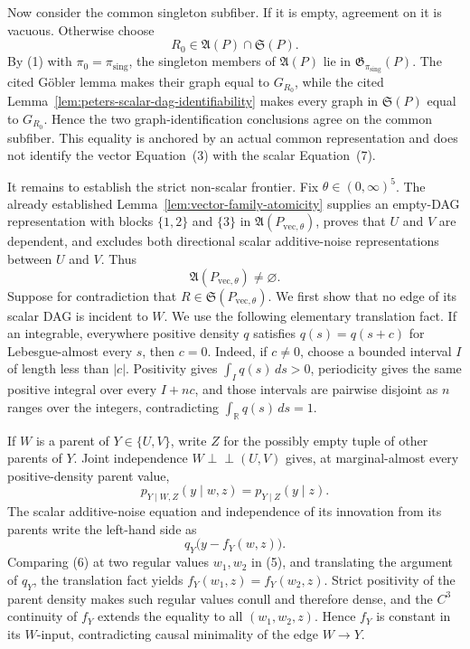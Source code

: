 Now consider the common singleton subfiber. If it is empty, agreement on it is vacuous. Otherwise choose
\[
R_0\in\mathfrak A(P)\cap\mathfrak S(P).
\]
By (1) with \(\pi_0=\pi_{\mathrm{sing}}\), the singleton members of \(\mathfrak A(P)\) lie in \(\mathfrak G_{\pi_{\mathrm{sing}}}(P)\). The cited Göbler lemma makes their graph equal to \(G_{R_0}\), while the cited Lemma~\ref{lem:peters-scalar-dag-identifiability} makes every graph in \(\mathfrak S(P)\) equal to \(G_{R_0}\). Hence the two graph-identification conclusions agree on the common subfiber. This equality is anchored by an actual common representation and does not identify the vector Equation~(3) with the scalar Equation~(7).

It remains to establish the strict non-scalar frontier. Fix \(\theta\in(0,\infty)^5\). The already established Lemma~\ref{lem:vector-family-atomicity} supplies an empty-DAG representation with blocks \(\{1,2\}\) and \(\{3\}\) in \(\mathfrak A(P_{\mathrm{vec},\theta})\), proves that \(U\) and \(V\) are dependent, and excludes both directional scalar additive-noise representations between \(U\) and \(V\). Thus
\[
\mathfrak A(P_{\mathrm{vec},\theta})\neq\varnothing. \tag{4}
\]
Suppose for contradiction that \(R\in\mathfrak S(P_{\mathrm{vec},\theta})\). We first show that no edge of its scalar DAG is incident to \(W\). We use the following elementary translation fact. If an integrable, everywhere positive density \(q\) satisfies \(q(s)=q(s+c)\) for Lebesgue-almost every \(s\), then \(c=0\). Indeed, if \(c\neq0\), choose a bounded interval \(I\) of length less than \(|c|\). Positivity gives \(\int_I q(s)\,ds>0\), periodicity gives the same positive integral over every \(I+nc\), and those intervals are pairwise disjoint as \(n\) ranges over the integers, contradicting \(\int_{\mathbb R}q(s)\,ds=1\).

If \(W\) is a parent of \(Y\in\{U,V\}\), write \(Z\) for the possibly empty tuple of other parents of \(Y\). Joint independence \(W\perp\!\!\!\perp(U,V)\) gives, at marginal-almost every positive-density parent value,
\[
p_{Y\mid W,Z}(y\mid w,z)=p_{Y\mid Z}(y\mid z). \tag{5}
\]
The scalar additive-noise equation and independence of its innovation from its parents write the left-hand side as
\[
q_Y\bigl(y-f_Y(w,z)\bigr). \tag{6}
\]
Comparing (6) at two regular values \(w_1,w_2\) in (5), and translating the argument of \(q_Y\), the translation fact yields \(f_Y(w_1,z)=f_Y(w_2,z)\). Strict positivity of the parent density makes such regular values conull and therefore dense, and the \(C^3\) continuity of \(f_Y\) extends the equality to all \((w_1,w_2,z)\). Hence \(f_Y\) is constant in its \(W\)-input, contradicting causal minimality of the edge \(W\to Y\).

